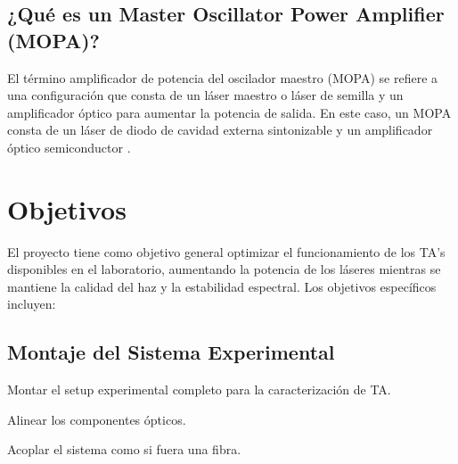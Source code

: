 \documentclass[12pt]{article}
\newcounter{checkcount}
\newcommand{\chk}{
    \stepcounter{checkcount} 
    \CheckBox[name=\thecheckcount, 
            bordercolor= Purple,backgroundcolor= Lavender!40!White]{} \hspace{1pt}}
\newenvironment{todolist}{
    \begin{list}{\chk}
            {\setlength{\parsep}{0pt plus2pt minus1pt} 
            \setlength{\labelsep}{1pt} }
            }
    {\end{list}}
\begin{document}
\subsection{¿Qué es un Master Oscillator Power Amplifier (MOPA)?}
El término amplificador de potencia del oscilador maestro (MOPA) se refiere a una configuración que consta de un láser maestro o láser de semilla y un amplificador óptico para aumentar la potencia de salida. En este caso, un MOPA consta de un láser de diodo de cavidad externa sintonizable y un amplificador óptico semiconductor \cite{Paschotta_2005_master_oscillator_power_amplifier}.

\section{Objetivos}
El proyecto tiene como objetivo general optimizar el funcionamiento de los TA’s disponibles en el laboratorio, aumentando la potencia de los láseres mientras se mantiene la calidad del haz y la estabilidad espectral. Los objetivos específicos incluyen:

\subsection*{Montaje del Sistema Experimental}

\begin{todolist}
  \item Montar el setup experimental completo para la caracterización de TA.
  \item Alinear los componentes ópticos.
  \item Acoplar el sistema como si fuera una fibra.
\end{todolist}
\end{document}
